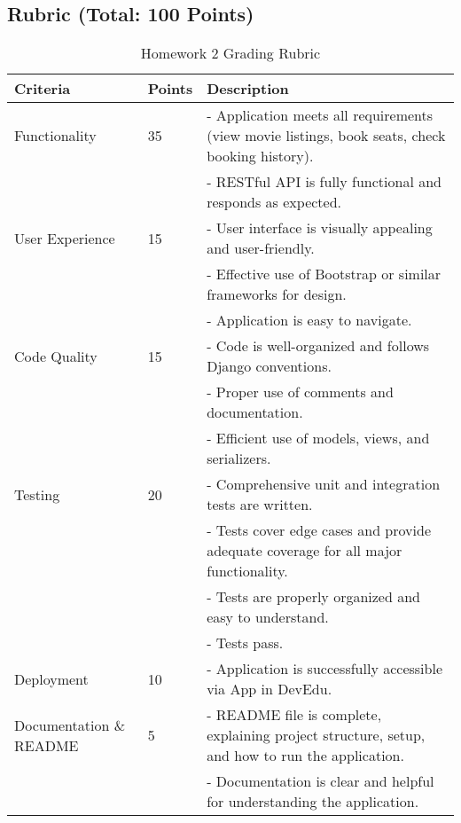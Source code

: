 \documentclass{article}
\begin{document}
\subsection{Rubric (Total: 100 Points)}

\begin{table}[ht]
\centering
\small
\begin{tabular}{l l p{8cm}}
\hline
\textbf{Criteria} & \textbf{Points} & \textbf{Description} \\
\hline
Functionality &
35 &
- Application meets all requirements (view movie listings, book seats, check booking history).\\
& &
- RESTful API is fully functional and responds as expected. \newline \\
User Experience &
15 &
- User interface is visually appealing and user-friendly.\\
& &
- Effective use of Bootstrap or similar frameworks for design.\\
& &
- Application is easy to navigate. \newline \\
Code Quality &
15 &
- Code is well-organized and follows Django conventions. \\
& &
- Proper use of comments and documentation. \\
& &
- Efficient use of models, views, and serializers. \newline \\
Testing &
20 &
- Comprehensive unit and integration tests are written.\\
& &
- Tests cover edge cases and provide adequate coverage for all major functionality.\\
& &
- Tests are properly organized and easy to understand. \\
& & 
- Tests pass. \newline \\
Deployment &
10 &
- Application is successfully accessible via App in DevEdu. \newline \\ 
Documentation \& README &
5 &
- README file is complete, explaining project structure, setup, and how to run the application.\\
& &
- Documentation is clear and helpful for understanding the application.\\
\hline
\end{tabular}
\caption{Homework 2 Grading Rubric}
\end{table}
\end{document}
